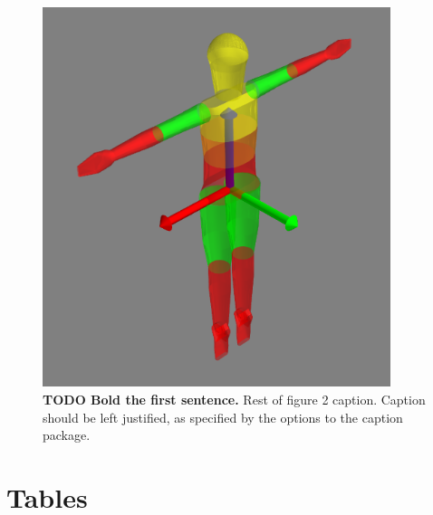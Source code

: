 \documentclass[10pt]{article}
\begin{document}
\begin{figure}[!ht]
\begin{center}
    \includegraphics[width=4in]{figfactory/iceskater.png}
\end{center}
\caption{
{\bf TODO Bold the first sentence.}  Rest of figure 2  caption.  Caption 
should be left justified, as specified by the options to the caption 
package.
}
\label{fig:iceskater}
\end{figure}

\section*{Tables}
\end{document}
